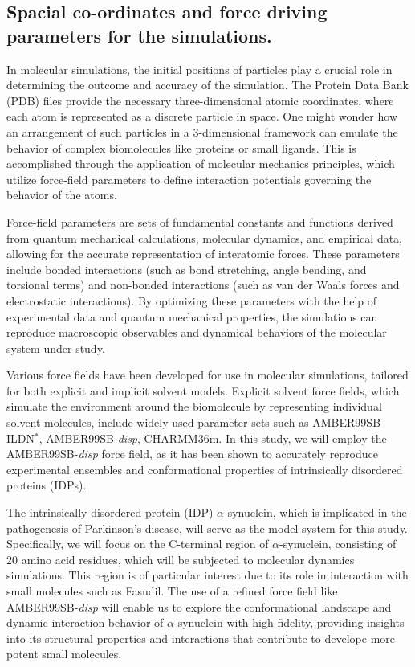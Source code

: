 \subsection{Spacial co-ordinates and force driving parameters for the simulations.}

In molecular simulations, the initial positions of particles play a crucial role in determining the outcome and accuracy of the simulation.
The Protein Data Bank (PDB) files provide the necessary three-dimensional atomic coordinates, where each atom is represented as a discrete particle in space.
One might wonder how an arrangement of such particles in a 3-dimensional framework can emulate the behavior of complex biomolecules like proteins or small ligands.
This is accomplished through the application of molecular mechanics principles, which utilize force-field parameters to define interaction potentials governing the behavior of the atoms.

Force-field parameters are sets of fundamental constants and functions derived from quantum mechanical calculations, molecular dynamics, and empirical data, allowing for the accurate representation of interatomic forces.
These parameters include bonded interactions (such as bond stretching, angle bending, and torsional terms) and non-bonded interactions (such as van der Waals forces and electrostatic interactions).
By optimizing these parameters with the help of experimental data and quantum mechanical properties, the simulations can reproduce macroscopic observables and dynamical behaviors of the molecular system under study.

Various force fields have been developed for use in molecular simulations, tailored for both explicit and implicit solvent models.
Explicit solvent force fields, which simulate the environment around the biomolecule by representing individual solvent molecules, include widely-used parameter sets such as AMBER99SB-ILDN$^{*}$, AMBER99SB-\textit{disp}, CHARMM36m.
In this study, we will employ the AMBER99SB-\textit{disp} force field, as it has been shown to accurately reproduce experimental ensembles and conformational properties of intrinsically disordered proteins (IDPs).

The intrinsically disordered protein (IDP) $\alpha$-synuclein, which is implicated in the pathogenesis of Parkinson’s disease, will serve as the model system for this study.
Specifically, we will focus on the C-terminal region of $\alpha$-synuclein, consisting of 20 amino acid residues, which will be subjected to molecular dynamics simulations.
This region is of particular interest due to its role in interaction with small molecules such as Fasudil.
The use of a refined force field like AMBER99SB-\textit{disp} will enable us to explore the conformational landscape and dynamic interaction behavior of $\alpha$-synuclein with high fidelity, providing insights into its structural properties 
and interactions that contribute to develope more potent small molecules.\\

